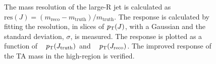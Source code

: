 \begin{figure}[htbp]
\centering
  \caption[Response of track assisted mass and calorimeter mass of large-R jet]{ The mass resolution of the large-R jet is calculated as $\text{res}(J) = (m_{\text{reco}}-m_{\text{truth}})/m_{\text{truth}}$. The response is calculated by fitting the resolution, in slices of $p_{\rm T}(J)$, with a Gaussian and the standard deviation, $\sigma$, is measured.
	The response is plotted as a function of ~ $p_{\rm T}(J_{\text{truth}})$ and
	~ $p_{\rm T}(J_{\text{reco}})$. The improved response of the TA mass in the high-\pT region is verified.}
  \label{fig:ta_vs_calo_res}
\end{figure}

